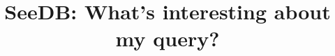 \documentclass{sig-alternate}
\begin{document}
\newcommand{\agp}[1]{\textcolor{red}{Aditya: #1}}
\newcommand{\SeeDB}{{\sc SeeDB}}
\newcommand{\calQ}{\mathcal{Q}}
\newcommand{\calR}{\mathcal{R}}
\newcommand{\att}[1]{{\text{#1}}}

\newtheorem{definition}{Definition}[section]
\newtheorem{example}[definition]{Example}
\newtheorem{goal}{Goal}[section]
\renewcommand{\baselinestretch}{0.995}





\newcommand{\squishlist}{
   \begin{list}{$\bullet$}
    { \setlength{\itemsep}{0pt}
      \setlength{\parsep}{2pt}
      \setlength{\topsep}{0pt}
      \setlength{\partopsep}{0pt}
      \leftmargin=25pt
\rightmargin=0pt
\labelsep=5pt
\labelwidth=10pt
\itemindent=0pt
\listparindent=0pt
\itemsep=\parsep
    }
}
\newcommand{\squishend}{\end{list}}

\newenvironment{denselist}{
    \begin{list}{\tiny{$\bullet$}}%
    {\setlength{\itemsep}{0ex} \setlength{\topsep}{0ex}
    \setlength{\parsep}{0pt} \setlength{\itemindent}{0pt}
    \setlength{\leftmargin}{0.5em}
    \setlength{\partopsep}{0pt}}}%
    {\end{list}}

\newcommand{\eat}[1]{}
\newcommand{\papertext}[1]{#1}
\newcommand{\techreport}[1]{}

\newcommand{\techreporttext}[1]{}
\newcommand{\stitle}[1]{\vspace{0.25em}\noindent\textbf{#1}}




\title{SeeDB: What's interesting about my query?\vspace{-5pt}}




\maketitle                                                                                       

\begin{abstract}

\end{abstract}




  

{\scriptsize


}
\end{document}
